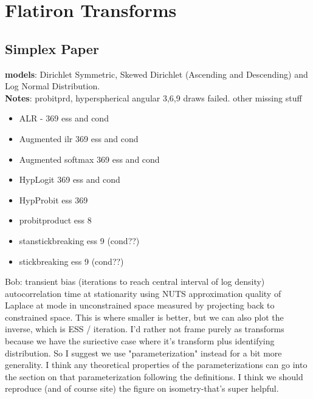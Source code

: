 \section{Flatiron Transforms}
\label{sec:transforms}
\subsection{Simplex Paper}


\textbf{models}: Dirichlet Symmetric, Skewed Dirichlet (Ascending and Descending) and Log Normal Distribution.\\

\textbf{Notes}: probitprd, hyperspherical angular 3,6,9 draws failed. other missing stuff
\begin{itemize}
\item ALR - 369 ess and cond
\item Augmented ilr 369 ess and cond
\item Augmented softmax 369 ess and cond
\item HypLogit 369 ess and cond
\item HypProbit ess 369

\item probitproduct ess 8
\item stanstickbreaking ess 9 (cond??)
\item stickbreaking ess 9 (cond??)
\end{itemize}


Bob: transient bias (iterations to reach central interval of log density)
autocorrelation time at stationarity using NUTS
approximation quality of Laplace at mode in unconstrained space measured by projecting back to constrained space. This is where smaller is better, but we can also plot the inverse, which is ESS / iteration. I'd rather not frame purely as transforms because we have the suriective case where it's transform plus identifying distribution. So I suggest we use "parameterization" instead for a bit more generality. I think any theoretical properties of the parameterizations can go into the section on that parameterization following the definitions. I think we should reproduce (and of course site) the figure on isometry-that's super helpful.